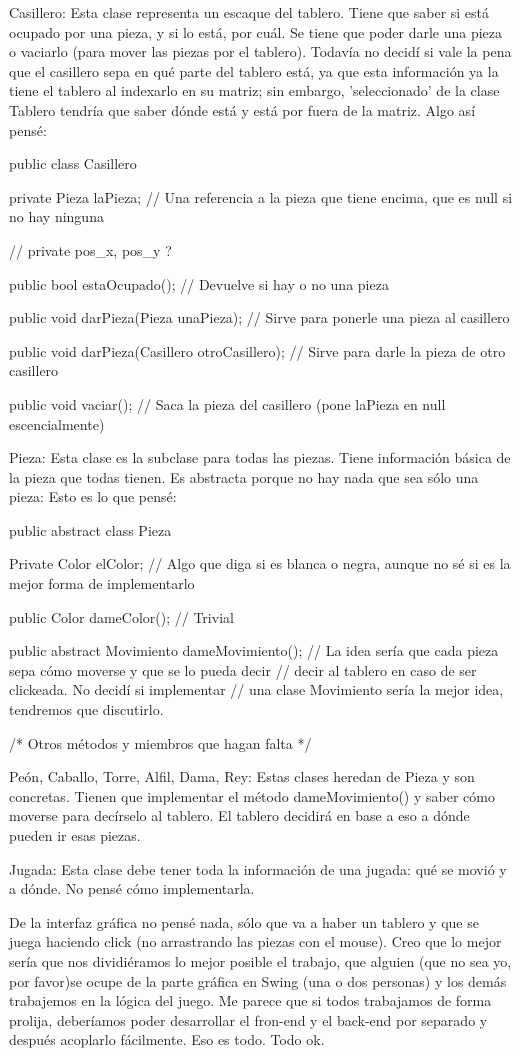 Casillero:
Esta clase representa un escaque del tablero. Tiene que saber si está ocupado por una pieza, y si lo está, por cuál. Se tiene que poder darle una pieza o vaciarlo (para mover las piezas por el tablero). Todavía no decidí si vale la pena que el casillero sepa en qué parte del tablero está, ya que esta información ya la tiene el tablero al indexarlo en su matriz; sin embargo, 'seleccionado' de la clase Tablero tendría que saber dónde está y está por fuera de la matriz. Algo así pensé:

public class Casillero {
	
	private Pieza laPieza;	// Una referencia a la pieza que tiene encima, que es null si no hay ninguna

	// private pos_x, pos_y ?

	public bool estaOcupado();	// Devuelve si hay o no una pieza

	public void darPieza(Pieza unaPieza);	// Sirve para ponerle una pieza al casillero

	public void darPieza(Casillero otroCasillero);	// Sirve para darle la pieza de otro casillero

	public void vaciar();	// Saca la pieza del casillero (pone laPieza en null escencialmente)

}

Pieza:
Esta clase es la subclase para todas las piezas. Tiene información básica de la pieza que todas tienen. Es abstracta porque no hay nada que sea sólo una pieza: Esto es lo que pensé:

public abstract class Pieza {
	
	Private Color elColor;	// Algo que diga si es blanca o negra, aunque no sé si es la mejor forma de implementarlo

	public Color dameColor();	//	Trivial

	public abstract Movimiento dameMovimiento();	// La idea sería que cada pieza sepa cómo moverse y que se lo pueda decir
													// decir al tablero en caso de ser clickeada. No decidí si implementar
													// una clase Movimiento sería la mejor idea, tendremos que discutirlo.

	/* Otros métodos y miembros que hagan falta */

}

Peón, Caballo, Torre, Alfil, Dama, Rey:
Estas clases heredan de Pieza y son concretas. Tienen que implementar el método dameMovimiento() y saber cómo moverse para decírselo al tablero. El tablero decidirá en base a eso a dónde pueden ir esas piezas.

Jugada:
Esta clase debe tener toda la información de una jugada: qué se movió y a dónde. No pensé cómo implementarla.

De la interfaz gráfica no pensé nada, sólo que va a haber un tablero y que se juega haciendo click (no arrastrando las piezas con el mouse). Creo que lo mejor sería que nos dividiéramos lo mejor posible el trabajo, que alguien (que no sea yo, por favor)se ocupe de la parte gráfica en Swing (una o dos personas) y los demás trabajemos en la lógica del juego. Me parece que si todos trabajamos de forma prolija, deberíamos poder desarrollar el fron-end y el back-end por separado y después acoplarlo fácilmente. Eso es todo.
Todo ok.